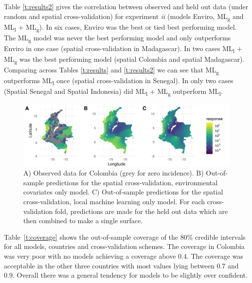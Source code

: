 \documentclass[review]{elsarticle}
\begin{document}
Table \ref{t:results2} gives the correlation between observed and held out data (under random and spatial cross-validation) for experiment \emph{ii} (models Enviro, ML\textsubscript{g} and ML\textsubscript{l} + ML\textsubscript{g}).
In six cases, Enviro was the best or tied best performing model.
The ML\textsubscript{g} model was never the best performing model and only outperforms Enviro in one case (spatial cross-validation in Madagascar).
In two cases ML\textsubscript{l} + ML\textsubscript{g} was the best performing model (spatial Colombia and spatial Madagascar).
Comparing across Tables \ref{t:results} and \ref{t:results2} we can see that ML\textsubscript{g} outperforms ML\textsubscript{l} once (spatial cross-validation in Senegal).
In only two cases (Spatial Senegal and Spatial Indonesia) did ML\textsubscript{l} + ML\textsubscript{g} outperform ML\textsubscript{l}.



\begin{figure}[t!]
\centering
\includegraphics[width = 1\textwidth]{figs/col_comparison_map.png} %
\caption{
  A) Observed data for Colombia (grey for zero incidence). B) Out-of-sample predictions for the spatial cross-validation, environmental covariates only model. C) Out-of-sample predictions for the spatial cross-validation, local machine learning only model. For each cross-validation fold, predictions are made for the held out data which are then combined to make a single surface.
}
\label{f:map}
\end{figure}

Table~\ref{t:coverage} shows the out-of-sample coverage of the 80\% credible intervals for all models, countries and cross-validation schemes.
The coverage in Colombia was very poor with no models achieving a coverage above 0.4.
The coverage was acceptable in the other three countries with most values lying between 0.7 and 0.9.
Overall there was a general tendency for models to be slightly over confident.
\end{document}
